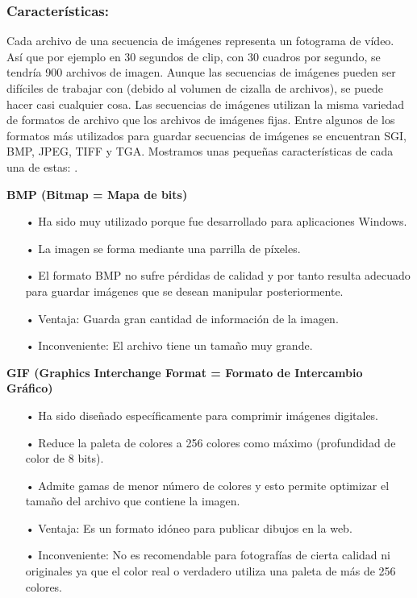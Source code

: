 \subsubsection{Características:}
Cada archivo de una secuencia de imágenes representa un fotograma de vídeo. Así que por ejemplo en 30 segundos de clip, con 30 cuadros por segundo, se tendría 900 archivos de imagen. Aunque las secuencias de imágenes pueden ser difíciles de trabajar con (debido al volumen de cizalla de archivos), se puede hacer casi cualquier cosa.
\vskip 0.1cm
Las secuencias de imágenes utilizan la misma variedad de formatos de archivo que los archivos de imágenes fijas. Entre algunos de los formatos más utilizados para guardar secuencias de imágenes se encuentran SGI, BMP, JPEG, TIFF y TGA. Mostramos unas pequeñas características de cada una de estas:
\vskip 0.1cm \cite{Web}.

{\bf BMP (Bitmap = Mapa de bits)} \vskip 0.1cm

\begin{itemize}
\item[•] Ha sido muy utilizado porque fue desarrollado para aplicaciones Windows.
\item[•] La imagen se forma mediante una parrilla de píxeles.
\item[•] El formato BMP no sufre pérdidas de calidad y por tanto resulta adecuado para guardar imágenes que se desean manipular posteriormente.
\item[•] Ventaja: Guarda gran cantidad de información de la imagen. 
\item[•] Inconveniente: El archivo tiene un tamaño muy grande.
\end{itemize}

{\bf GIF (Graphics Interchange Format = Formato de Intercambio Gráfico)} \vskip 0.1cm

\begin{itemize}
\item[•] Ha sido diseñado específicamente para comprimir imágenes digitales.
\item[•] Reduce la paleta de colores a 256 colores como máximo (profundidad de color de 8 bits).
\item[•] Admite gamas de menor número de colores y esto permite optimizar el tamaño del archivo que contiene la imagen.
\item[•] Ventaja: Es un formato idóneo para publicar dibujos en la web.
\item[•] Inconveniente: No es recomendable para fotografías de cierta calidad ni originales ya que el color real o verdadero utiliza una paleta de más de 256 colores.
\end{itemize}

